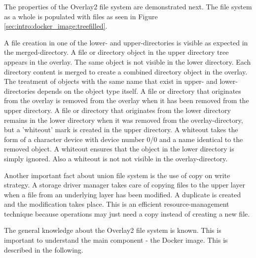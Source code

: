 The properties of the Overlay2 file system are demonstrated next.
The file system as a whole is populated with files as seen in Figure \ref{sec:intro:docker_image:treefilled}.

A file creation in one of the lower- and upper-directories is visible as expected in the merged-directory.
A file or directory object in the upper directory tree appears in the overlay. The same object is not visible in the lower directory.
Each directory content is merged to create a combined directory object in the overlay.
The treatment of objects with the same name that exist in upper- and lower-directories depends on the object type itself.
A file or directory that originates from the overlay is removed from the overlay when it has been removed from the upper directory. 
A file or directory that originates from the lower directory remains in the lower directory when it was removed from the overlay-directory, but a 'whiteout' mark is created in the upper directory. A whiteout takes the form of a character device with device number 0/0 and a name identical to the removed object. A whiteout ensures that the object in the lower directory is simply ignored. Also a whiteout is not not visible in the overlay-directory. 

Another important fact about union file system is the use of copy on write strategy. 
A storage driver manager takes care of copying files to the upper layer when a file from an underlying layer has been modified. A duplicate is created and the modification takes place. This is an efficient resource-management technique because operations may just need a copy instead of creating a new file.
	
The general knowledge about the Overlay2 file system is known. This is important to understand the main component - the Docker image. This is described in the following.